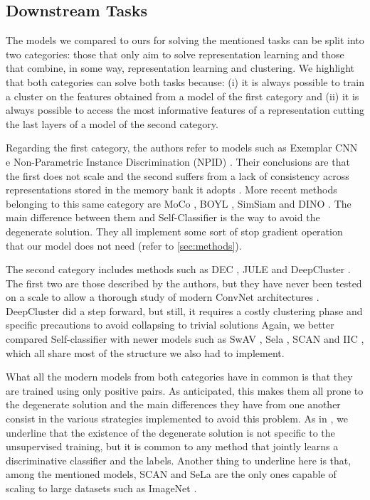 \documentclass{article}
\begin{document}
\subsection{Downstream Tasks}
The models we compared to ours for solving the mentioned tasks can be split into two categories: those that only aim to solve representation learning and those that combine, in some way, representation learning and clustering. We highlight that both categories can solve both tasks because: (i) it is always possible to train a cluster on the features obtained from a model of the first category and (ii) it is always possible to access the most informative features of a representation cutting the last layers of a model of the second category. 

Regarding the first category, the authors refer to models such as Exemplar CNN \cite{cnn} e Non-Parametric Instance Discrimination (NPID) \cite{npid}. Their conclusions are that the first does not scale and the second suffers from a lack of consistency across representations stored in the memory bank it adopts \cite{self_classifier}. More recent methods belonging to this same category are MoCo \cite{moco}, BOYL \cite{byol}, SimSiam \cite{simsiam} and DINO \cite{dino}. The main difference between them and Self-Classifier is the way to avoid the degenerate solution. They all implement some sort of stop gradient operation that our model does not need (refer to \autoref{sec:methods}).

The second category includes methods such as DEC \cite{dec}, JULE \cite{jule} and DeepCluster \cite{deepcluster}. The first two are those described by the authors, but they have never been tested on a scale to allow a thorough study of modern ConvNet architectures \cite{deepcluster}. DeepCluster did a step forward, but still, it requires a costly clustering phase and specific precautions to avoid collapsing to trivial solutions \cite{byol}
Again, we better compared Self-classifier with newer models such as SwAV \cite{swav}, Sela \cite{sela}, SCAN \cite{scan} and IIC \cite{iic}, which all share most of the structure we also had to implement. 

What all the modern models from both categories have in common is that they are trained using only positive pairs. As anticipated, this makes them all prone to the degenerate solution and the main differences they have from one another consist in the various strategies implemented to avoid this problem. As in \cite{deepcluster}, we underline that the existence of the degenerate solution is not specific to the unsupervised training, but it is common to any method that jointly learns a discriminative classifier and the labels. Another thing to underline here is that, among the mentioned models, SCAN \cite{scan} and SeLa \cite{sela} are the only ones capable of scaling to large datasets such as ImageNet \cite{imagenet}.
\end{document}
